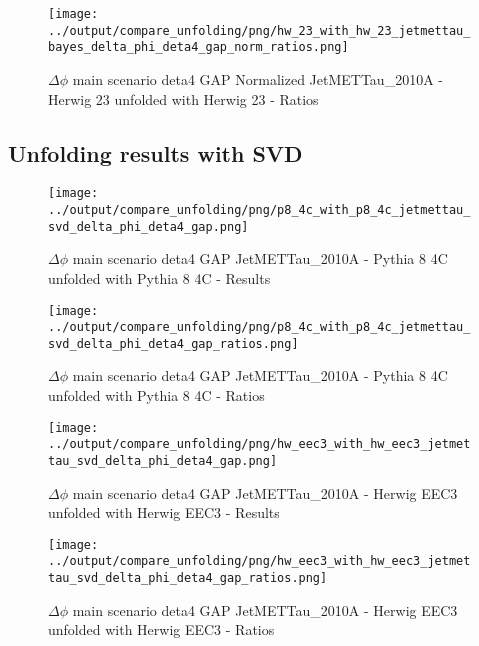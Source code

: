 \documentclass[11pt]{book}
\begin{document}
\begin{figure}[ht]
\centering
\texttt{[image: ../output/compare\_unfolding/png/hw\_23\_with\_hw\_23\_jetmettau\_bayes\_delta\_phi\_deta4\_gap\_norm\_ratios.png]}
\caption{$\Delta\phi$ main scenario deta4 GAP Normalized JetMETTau\_2010A - Herwig 23 unfolded with Herwig 23 - Ratios}
\label{hw_23_hw_23_jetmettau_bayes_delta_phi_deta4_gap_norm_b}
\end{figure}




\clearpage
\subsection{Unfolding results with SVD}

\begin{figure}[ht]
\centering
\texttt{[image: ../output/compare\_unfolding/png/p8\_4c\_with\_p8\_4c\_jetmettau\_svd\_delta\_phi\_deta4\_gap.png]}
\caption{$\Delta\phi$ main scenario deta4 GAP JetMETTau\_2010A - Pythia 8 4C unfolded with Pythia 8 4C - Results}
\label{p8_p8_jetmettau_svd_delta_phi_deta4_gap_a}
\end{figure}

\begin{figure}[ht]
\centering
\texttt{[image: ../output/compare\_unfolding/png/p8\_4c\_with\_p8\_4c\_jetmettau\_svd\_delta\_phi\_deta4\_gap\_ratios.png]}
\caption{$\Delta\phi$ main scenario deta4 GAP JetMETTau\_2010A - Pythia 8 4C unfolded with Pythia 8 4C - Ratios}
\label{p8_p8_jetmettau_svd_delta_phi_deta4_gap_b}
\end{figure}

\begin{figure}[ht]
\centering
\texttt{[image: ../output/compare\_unfolding/png/hw\_eec3\_with\_hw\_eec3\_jetmettau\_svd\_delta\_phi\_deta4\_gap.png]}
\caption{$\Delta\phi$ main scenario deta4 GAP JetMETTau\_2010A - Herwig EEC3 unfolded with Herwig EEC3 - Results}
\label{hw_eec3_hw_eec3_jetmettau_svd_delta_phi_deta4_gap_a}
\end{figure}

\begin{figure}[ht]
\centering
\texttt{[image: ../output/compare\_unfolding/png/hw\_eec3\_with\_hw\_eec3\_jetmettau\_svd\_delta\_phi\_deta4\_gap\_ratios.png]}
\caption{$\Delta\phi$ main scenario deta4 GAP JetMETTau\_2010A - Herwig EEC3 unfolded with Herwig EEC3 - Ratios}
\label{hw_eec3_hw_eec3_jetmettau_svd_delta_phi_deta4_gap_b}
\end{figure}
\end{document}
